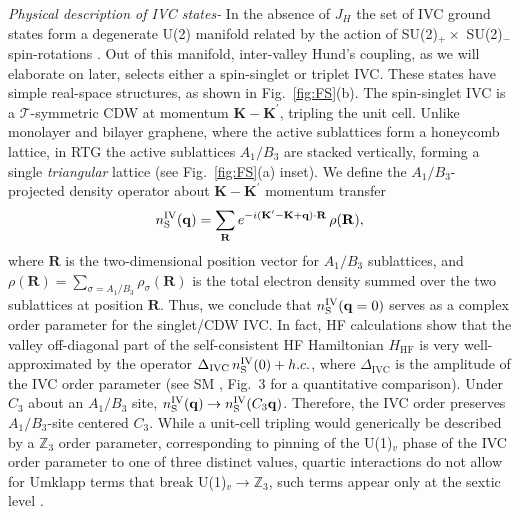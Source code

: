 \documentclass[aps,pra,twocolumn,superscriptaddress,10pt,article,nofootinbib,showpacs,longbibliography]{revtex4-1}
\def \q{{\mathbf q}}
\def \R{{\mathbf R}}
\def \T{{\mathcal T}}
\def \K{{\mathbf K}}
\def \Kp{{\mathbf K^\prime}}
\def \R{{\mathbf R}}
\def \beq{\begin{eqnarray}}
\def \eeq{\end{eqnarray}}
\begin{document}
\emph{Physical description of IVC states-}
In the absence of $J_H$ the set of IVC ground states form a degenerate U(2) manifold related by the action of SU(2)$_+ \times$ SU(2)$_-$ spin-rotations \cite{HalperinRice,Aleiner2007}.
Out of this manifold, inter-valley Hund's coupling, as we will elaborate on later, selects either a spin-singlet or triplet IVC. 
These states have simple real-space structures, as shown in Fig.~\ref{fig:FS}(b).
The spin-singlet IVC is a $\T$-symmetric CDW at momentum $\K - \Kp$, tripling the unit cell.
Unlike  monolayer and bilayer graphene, where the active sublattices form a honeycomb lattice, in RTG the active sublattices $A_1/B_3$ are stacked vertically, forming a single \emph{triangular} lattice (see Fig.~\ref{fig:FS}(a) inset). 
We define the $A_1/B_3$-projected density operator about $\K - \K^\prime$ momentum transfer 
\beq
n^{\rm IV}_{\rm S}(\q) =  \sum_{\R} e^{- i(\Kp - \K + \q)\cdot \R} \, \rho(\R),
\eeq
where $\R$ is the two-dimensional position vector for $A_1/B_3$ sublattices, and $\rho(\R) = \sum_{\sigma = A_1/B_3} \rho_\sigma(\R)$ is the total electron density summed over the two sublattices at position $\R$.
Thus, we conclude that $n^{\rm IV}_{\rm S}(\q=0)$ serves as a complex order parameter for the singlet/CDW IVC.
In fact, HF calculations show that the valley off-diagonal part of the self-consistent HF Hamiltonian $H_{\textrm{HF}}$ is very well-approximated by the operator $\Delta_{\textrm{IVC}} \, n^{\rm IV}_{\rm S}(0) + h.c.$, where $\Delta_{\textrm{IVC}}$ is the amplitude of the IVC order parameter (see SM \cite{SM}, Fig.~3 for a quantitative comparison). 
Under $C_3$ about an $A_1/B_3$ site, $n^{\rm IV}_{\rm S}(\q) \to n^{\rm IV}_{\rm S}(C_3 \q)$.
Therefore, the IVC order preserves $A_1/B_3$-site centered $C_3$.
While a unit-cell tripling would generically be described by a $\mathbb{Z}_3$ order parameter, corresponding to pinning of the U(1)$_v$ phase of the IVC order parameter to one of three distinct values, quartic interactions do not allow for Umklapp terms that break U(1)$_v \to \mathbb{Z}_3$, such terms appear only at the sextic level \cite{Aleiner2007}. 
\end{document}

